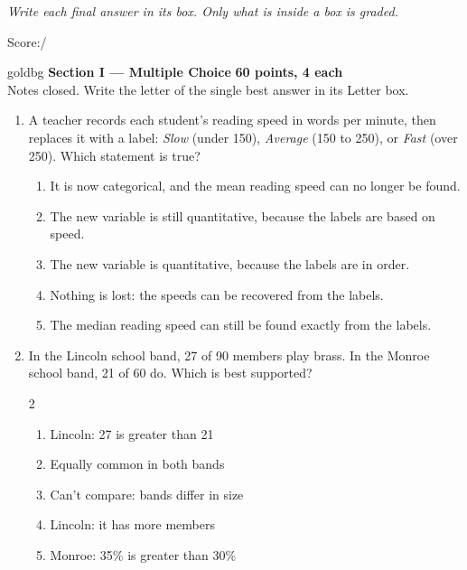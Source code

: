 \documentclass[12pt]{article}
\newenvironment{choices}
  {\begin{enumerate}[label=\textbf{(\Alph*)}, leftmargin=2.2em, itemsep=0pt, topsep=1pt]}
  {\end{enumerate}}
\newcommand{\letterroom}{\rule[-15pt]{0pt}{36pt}}
\begin{document}
{\small\itshape Write each final answer in its box. Only what is inside a box is graded.}\par

\hfill\small Score:\;\blank{1.3cm}\;/\normalsize
\vspace{0.04in}

\boxguard[6]
\begin{headlinebox}{goldbg}
\small
\textbf{Section I --- Multiple Choice} \hfill \textbf{60 points, 4 each}\\
Notes closed. Write the letter of the single best answer in its Letter box.
\end{headlinebox}

\vspace{0.06in}

\begin{enumerate}[leftmargin=1.9em, itemsep=0.03in]

  \boxguard[10]
  \item A teacher records each student's reading speed in words per minute, then replaces it
        with a label: \emph{Slow} (under 150), \emph{Average} (150 to 250), or \emph{Fast} (over
        250). Which statement is true?
        \begin{choices}
          \item It is now categorical, and the mean reading speed can no longer be found.
          \item The new variable is still quantitative, because the labels are based on speed.
          \item The new variable is quantitative, because the labels are in order.
          \item Nothing is lost: the speeds can be recovered from the labels.
          \item The median reading speed can still be found exactly from the labels.
                \hfill{}\letterroom
        \end{choices}

  \boxguard[10]
  \item In the Lincoln school band, 27 of 90 members play brass. In the Monroe school band, 21 of
        60 do. Which is best supported?\hfill{}\letterroom
        \begin{multicols}{2}
        \begin{choices}
          \item Lincoln: 27 is greater than 21
          \item Equally common in both bands
          \item Can't compare: bands differ in size
          \item Lincoln: it has more members
          \item Monroe: 35\% is greater than 30\%
        \end{choices}
        \end{multicols}


\end{enumerate}
\end{document}
